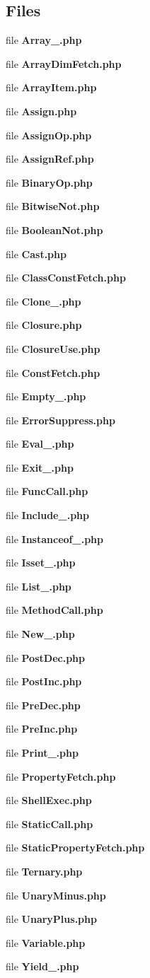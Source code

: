 \subsection*{Files}
\begin{DoxyCompactItemize}
\item 
file {\bf Array\+\_\+.\+php}
\item 
file {\bf Array\+Dim\+Fetch.\+php}
\item 
file {\bf Array\+Item.\+php}
\item 
file {\bf Assign.\+php}
\item 
file {\bf Assign\+Op.\+php}
\item 
file {\bf Assign\+Ref.\+php}
\item 
file {\bf Binary\+Op.\+php}
\item 
file {\bf Bitwise\+Not.\+php}
\item 
file {\bf Boolean\+Not.\+php}
\item 
file {\bf Cast.\+php}
\item 
file {\bf Class\+Const\+Fetch.\+php}
\item 
file {\bf Clone\+\_\+.\+php}
\item 
file {\bf Closure.\+php}
\item 
file {\bf Closure\+Use.\+php}
\item 
file {\bf Const\+Fetch.\+php}
\item 
file {\bf Empty\+\_\+.\+php}
\item 
file {\bf Error\+Suppress.\+php}
\item 
file {\bf Eval\+\_\+.\+php}
\item 
file {\bf Exit\+\_\+.\+php}
\item 
file {\bf Func\+Call.\+php}
\item 
file {\bf Include\+\_\+.\+php}
\item 
file {\bf Instanceof\+\_\+.\+php}
\item 
file {\bf Isset\+\_\+.\+php}
\item 
file {\bf List\+\_\+.\+php}
\item 
file {\bf Method\+Call.\+php}
\item 
file {\bf New\+\_\+.\+php}
\item 
file {\bf Post\+Dec.\+php}
\item 
file {\bf Post\+Inc.\+php}
\item 
file {\bf Pre\+Dec.\+php}
\item 
file {\bf Pre\+Inc.\+php}
\item 
file {\bf Print\+\_\+.\+php}
\item 
file {\bf Property\+Fetch.\+php}
\item 
file {\bf Shell\+Exec.\+php}
\item 
file {\bf Static\+Call.\+php}
\item 
file {\bf Static\+Property\+Fetch.\+php}
\item 
file {\bf Ternary.\+php}
\item 
file {\bf Unary\+Minus.\+php}
\item 
file {\bf Unary\+Plus.\+php}
\item 
file {\bf Variable.\+php}
\item 
file {\bf Yield\+\_\+.\+php}
\end{DoxyCompactItemize}
